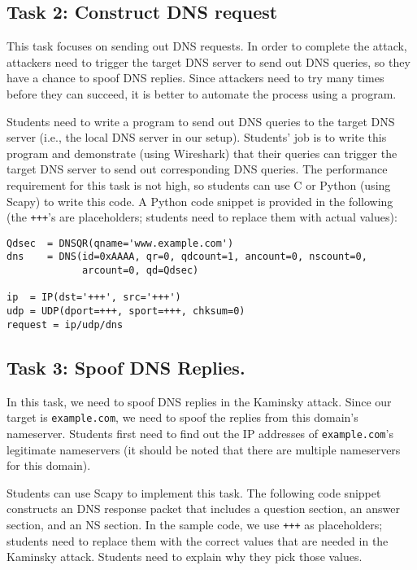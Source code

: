 \subsection{Task 2: Construct DNS request} 

This task focuses on sending out DNS requests. 
In order to complete the attack, attackers need to trigger the target 
DNS server to send out DNS queries, so they have a chance 
to spoof DNS replies. Since attackers need to try many times before they 
can succeed, it is better to automate the process using a program. 

Students need to write a program to send out DNS queries to the target DNS 
server (i.e., the local DNS server in our setup). 
Students' job is to write this program
and demonstrate (using Wireshark) that their queries can
trigger the target DNS server to send out corresponding DNS queries.
The performance requirement for this task is not high, so
students can use C or Python (using Scapy) to write this code. 
A Python code snippet is provided in the following (the 
\texttt{+++}'s are placeholders; students need to replace them
with actual values): 

\begin{lstlisting}
Qdsec  = DNSQR(qname='www.example.com')
dns    = DNS(id=0xAAAA, qr=0, qdcount=1, ancount=0, nscount=0,
             arcount=0, qd=Qdsec)

ip  = IP(dst='+++', src='+++')
udp = UDP(dport=+++, sport=+++, chksum=0)
request = ip/udp/dns
\end{lstlisting}
 


\subsection{Task 3: Spoof DNS Replies.}   

In this task, we need to spoof DNS replies in the Kaminsky attack. 
Since our target is \texttt{example.com}, we need to spoof
the replies from this domain's nameserver. Students first need to 
find out the IP addresses of \texttt{example.com}'s legitimate 
nameservers (it should be noted that there are multiple 
nameservers for this domain).

Students can use Scapy to implement this task. The following 
code snippet constructs an DNS response packet that includes 
a question section, an answer section, and an NS section. 
In the sample code, we use \texttt{+++} as placeholders; 
students need to replace them with the correct values 
that are needed in the Kaminsky attack. Students need to explain
why they pick those values. 

